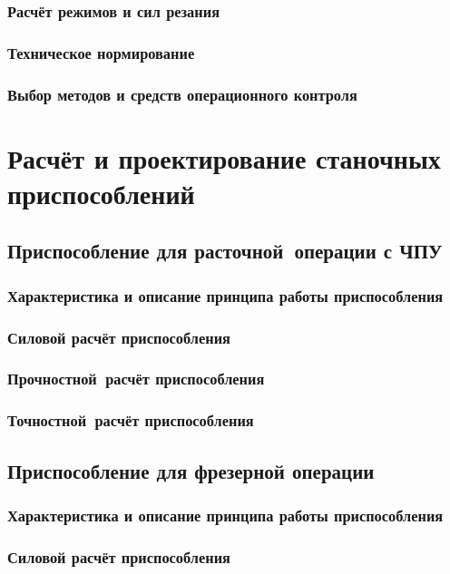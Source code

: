 \documentclass[14pt,russian,a4paper]{extreport}
\begin{document}
\subsection{Расчёт режимов и сил резания}
\subsection{Техническое нормирование}
\subsection{Выбор методов и средств операционного контроля}


\chapter{Расчёт и проектирование станочных приспособлений}

\section{Приспособление для расточной операции с ЧПУ}

\subsection{Характеристика и описание принципа работы приспособления}
\subsection{Силовой расчёт приспособления}
\subsection{Прочностной расчёт приспособления}
\subsection{Точностной расчёт приспособления}

\section{Приспособление для фрезерной операции}

\subsection{Характеристика и описание принципа работы приспособления}
\subsection{Силовой расчёт приспособления}
\end{document}

